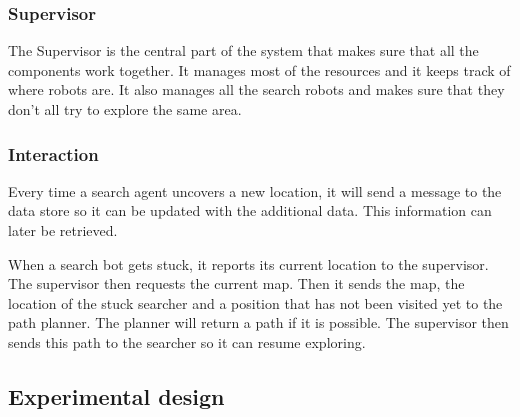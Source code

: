 \subsubsection{Supervisor}
The Supervisor is the central part of the system that makes sure that all
the components work together. It manages most of the resources and it keeps
track of where robots are. It also manages all the search robots and makes sure
that they don't all try to explore the same area.

\subsubsection{Interaction}
Every time a search agent uncovers a new location, it will send a message to
the data store so it can be updated with the additional data. This information
can later be retrieved.

When a search bot gets stuck, it reports its current location to the
supervisor. The supervisor then requests the current map. Then it sends the
map, the location of the stuck searcher and a position that has not been
visited yet to the path planner. The planner will return a path if it is
possible. The supervisor then sends this path to the searcher so it can
resume exploring.

\subsection{Experimental design}
